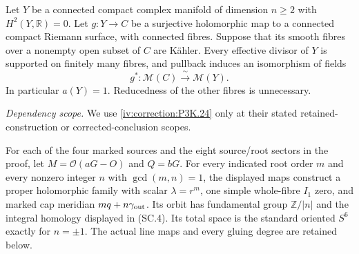
\begin{proposition}\hypertarget{tag-01GG}{}\label{cdp:st:E1}


Let $Y$ be a connected compact complex manifold of dimension $n\geq2$
with $H^2(Y,\mathbb R)=0$. Let $g:Y\to C$ be a surjective holomorphic
map to a connected compact Riemann surface, with connected fibres.
Suppose that its smooth fibres over a nonempty open subset of $C$ are
K\"ahler. Every effective divisor of $Y$ is supported on finitely many
fibres, and pullback induces an isomorphism of fields
\[
 g^*: \mathcal M(C)\xrightarrow{\ \sim\ }\mathcal M(Y).
\]
In particular $a(Y)=1$. Reducedness of the other fibres is unnecessary.
\end{proposition}

\begin{theorem}\hypertarget{tag-02SJ}{}\label{night:P3F.41}

\par\noindent\textit{Dependency scope.} We use \cref{iv:correction:P3K.24} only at their stated retained-construction or corrected-conclusion scopes.


For each of the four marked sources and the eight source/root sectors in the proof, let $M=\mathcal O(aG-O)$ and $Q=bG$. For every indicated root order $m$ and every nonzero integer $n$ with $\gcd(m,n)=1$, the displayed maps construct a proper holomorphic family with scalar $\lambda=r^m$, one simple whole-fibre $I_1$ zero, and marked cap meridian $mq+n\gamma_{\rm out}$. Its orbit has fundamental group $\mathbb Z/|n|$ and the integral homology displayed in \textup{(SC.4)}. Its total space is the standard oriented $S^6$ exactly for $n=\pm1$. The actual line maps and every gluing degree are retained below.
\end{theorem}

